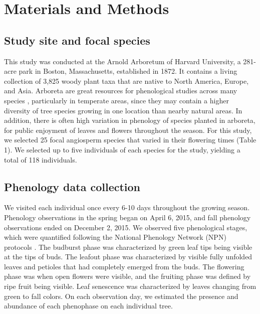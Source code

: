 \documentclass{article}
\begin{document}
\section* {Materials and Methods}
\subsection*{Study site and focal species}
This study was conducted at the Arnold Arboretum of Harvard University, a 281-acre park in Boston, Massachusetts, established in 1872. It contains a living collection of 3,825 woody plant taxa that are native to North America, Europe, and Asia. Arboreta are great resources for phenological studies across many species \citep [e.g., ][]{primack2009a}, particularly in temperate areas, since they may contain a higher diversity of tree species growing in one location than nearby natural areas. In addition, there is often high variation in phenology of species planted in arboreta, for public enjoyment of leaves and flowers throughout the season. For this study, we selected 25 focal angiosperm species that varied in their flowering times (Table 1). We selected up to five individuals of each species for the study, yielding a total of 118 individuals.

\subsection*{Phenology data collection}
We visited each individual once every 6-10 days throughout the growing season. Phenology observations in the spring began on April 6, 2015, and fall phenology observations ended on December 2, 2015. We observed five phenological stages, which were quantified following the National Phenology Network (NPN) protocols \citep[for a full description see][]{denny2014}. The budburst phase was characterized by green leaf tips being visible at the tips of buds. The leafout phase was characterized by visible fully unfolded leaves and petioles that had completely emerged from the buds. %
The flowering phase was when open flowers were visible, and the fruiting phase was defined by ripe fruit being visible. Leaf senescence was characterized by leaves changing from green to fall colors. On each observation day, we estimated the presence and abundance of each phenophase on each individual tree.
\end{document}
